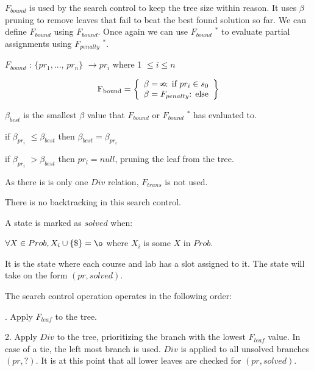 \documentclass[10pt]{article}
\def\infinity{\rotatebox{90}{8}}
\begin{document}
\bigskip
\bigskip


$F_{bound}$ is used by the search control to keep the tree size within reason. It uses $\beta$ pruning to remove leaves that fail to beat the best found solution so far.
We can define $F_{bound}$ using $F_{bound}$. Once again we can use $F_{bound}$ $^*$ to evaluate partial assignments using $F_{penalty}$ $^*$.

\bigskip
$F_{bound}$ : $\{pr_1, ...$, $pr_n \} $  $ \to pr_i $    where 1 $\leq i\leq n$

 \[
          \text{F\textsubscript{bound}} = \left\{\begin{array}{ll}
            \beta = \infinity $: if $pr_i \in s_0 \\
           \beta = F_{penalty} $: else$\\
            
            \end{array}\right\}
      \]
      
\bigskip

$\beta _{best}$ is the smallest $\beta$ value that $F_{bound}$ or  $F_{bound}$ $^*$ has evaluated to.


if $\beta _{pr_i}$ $\leq \beta _{best}$ then $\beta_ {best} = \beta _{pr_i } $


if $\beta _{pr_i}$  $> \beta _{best}$ then  $pr_i = null$, pruning the leaf from the tree.


\bigskip
\bigskip

As there is is only one $Div$ relation, $F_{trans}$ is not used. 

There is no backtracking in this search control.

\bigskip
\bigskip
\bigskip
A state is marked as $solved$ when:

\bigskip 

$\forall X \in Prob, X_i \cup \{ \$ \} = \o $ where $X_i$ is some $X$ in $Prob$.

It is the state where each course and lab has a slot assigned to it. The state will take on the form $(pr, solved)$.
\bigskip
\bigskip
\bigskip

The search control operation operates in the following order:

. Apply $F_{leaf}$ to the tree.

2. Apply $Div$ to the tree, prioritizing the branch with the lowest $F_{leaf}$ value. In case of a tie, the left most branch is used. $Div$ is applied to all unsolved branches $(pr, ?)$. It is at this point that all lower leaves are checked for $(pr, solved)$.
\end{document}
